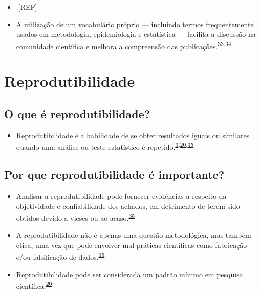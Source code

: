 \documentclass[
  a4paper,
]{book}
\providecommand{\tightlist}{%
  \setlength{\itemsep}{0pt}\setlength{\parskip}{0pt}}
\begin{document}
\begin{itemize}
\item
  .{[}REF{]}
\item
  A utilização de um vocabulário próprio --- incluindo termos frequentemente usados em metodologia, epidemiologia e estatística --- facilita a discussão na comunidade científica e melhora a compreensão das publicações.\textsuperscript{\protect\hyperlink{ref-amatuzzi2006}{33},\protect\hyperlink{ref-amatuzzi2006a}{34}}
\end{itemize}

\hypertarget{reprodutibilidade}{%
\section{Reprodutibilidade}\label{reprodutibilidade}}

\hypertarget{o-que-uxe9-reprodutibilidade}{%
\subsection{O que é reprodutibilidade?}\label{o-que-uxe9-reprodutibilidade}}

\begin{itemize}
\tightlist
\item
  Reprodutibilidade é a habilidade de se obter resultados iguais ou similares quando uma análise ou teste estatístico é repetido.\textsuperscript{\protect\hyperlink{ref-mair2016}{3},\protect\hyperlink{ref-hofner2015}{20},\protect\hyperlink{ref-resnik2016}{35}}
\end{itemize}

\hypertarget{por-que-reprodutibilidade-uxe9-importante}{%
\subsection{Por que reprodutibilidade é importante?}\label{por-que-reprodutibilidade-uxe9-importante}}

\begin{itemize}
\item
  Analisar a reprodutibilidade pode fornecer evidências a respeito da objetividade e confiabilidade dos achados, em detrimento de terem sido obtidos devido a vieses ou ao acaso.\textsuperscript{\protect\hyperlink{ref-resnik2016}{35}}
\item
  A reprodutibilidade não é apenas uma questão metodológica, mas também ética, uma vez que pode envolver mal práticas científicas como fabricação e/ou falsificação de dados.\textsuperscript{\protect\hyperlink{ref-resnik2016}{35}}
\item
  Reprodutibilidade pode ser considerada um padrão mínimo em pesquisa científica.\textsuperscript{\protect\hyperlink{ref-hofner2015}{20}}
\end{itemize}
\end{document}
